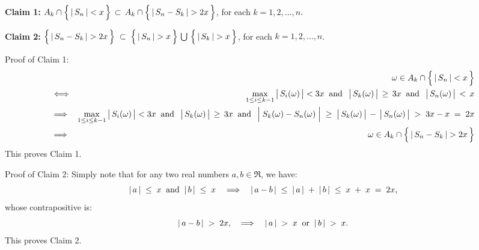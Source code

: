 \vskip 0.5cm
\begin{center}
\begin{minipage}{6.5in}
\noindent
\textbf{Claim 1:}\quad
$A_{k}\overset{{\color{white}:}}{\cap}\left\{\,\vert\,S_{n}\,\vert \overset{{\color{white}.}}{<} x\,\right\}
\,\subset\,
A_{k}\overset{{\color{white}:}}{\cap}\left\{\,\vert\,S_{n}-S_{k}\,\vert \overset{{\color{white}.}}{>} 2x\,\right\}$,\;
for each $k = 1, 2, \ldots, n$.

\vskip 0.3cm
\noindent
\textbf{Claim 2:}\quad
$\left\{\,\vert\,S_{n} - S_{k}\,\vert \overset{{\color{white}.}}{>} 2x\,\right\}
\;\subset\;
\left\{\,\vert\,S_{n}\,\vert \overset{{\color{white}.}}{>} x\,\right\}
\,\bigcup\,
\left\{\,\vert\,S_{k}\,\vert \overset{{\color{white}.}}{>} x\,\right\}$,\;
for each $k = 1, 2, \ldots, n$.
\end{minipage}
\end{center}

\vskip 0.5cm
\noindent
Proof of Claim 1:\quad
\begin{eqnarray*}
&&
	\omega \in A_{k}\overset{{\color{white}:}}{\cap}\left\{\,\vert\,S_{n}\,\vert \overset{{\color{white}.}}{<} x\,\right\}
\\
&\Longleftrightarrow&
	\underset{1\leq i \leq k-1}{\max} \left\vert\,S_{i}(\overset{{\color{white}.}}{\omega})\,\right\vert< 3x
	\;\;\textnormal{and}\;\;
	\left\vert\,S_{k}(\overset{{\color{white}.}}{\omega})\,\right\vert\,\geq\,3x
	\;\;\textnormal{and}\;\;
	\left\vert\,S_{n}(\overset{{\color{white}.}}{\omega})\,\right\vert\,<\,x
\\
&\Longrightarrow&
	\underset{1\leq i \leq k-1}{\max} \left\vert\,S_{i}(\overset{{\color{white}.}}{\omega})\,\right\vert< 3x
	\;\;\textnormal{and}\;\;
	\left\vert\,S_{k}(\overset{{\color{white}.}}{\omega})\,\right\vert\,\geq\,3x
	\;\;\textnormal{and}\;\;
	\left\vert\;S_{k}(\omega) \overset{{\color{white}.}}{-} S_{n}(\omega)\;\right\vert
	\;\geq\; \left\vert\,S_{k}(\overset{{\color{white}.}}{\omega})\,\right\vert \,-\, \left\vert\,S_{n}(\overset{{\color{white}.}}{\omega})\,\right\vert
	\;>\; 3x - x \; = \; 2x
\\
&\Longrightarrow&
	\omega \in A_{k}\overset{{\color{white}:}}{\cap}\left\{\,\vert\,S_{n}-S_{k}\,\vert \overset{{\color{white}.}}{>} 2x\,\right\}
\end{eqnarray*}
This proves Claim 1.

\vskip 0.8cm
\noindent
Proof of Claim 2:\quad
Simply note that for any two real numbers $a, b \in \Re$, we have:
\begin{equation*}
\vert\,a\,\vert \;\leq\; x
\;\;\textnormal{and}\;\;
\vert\,b\,\vert \;\leq\; x
\quad\Longrightarrow\quad
\vert\,a - b\,\vert \;\leq\; \vert\,a\,\vert \;+\; \vert\,b\,\vert \;\leq\; x \;+\; x \;=\; 2x,
\end{equation*}
whose contrapositive is:
\begin{equation*}
\vert\,a - b\,\vert \;>\; 2x,
\quad\Longrightarrow\quad
\vert\,a\,\vert \;>\; x
\;\;\textnormal{or}\;\;
\vert\,b\,\vert \;>\; x.
\end{equation*}
This proves Claim 2.

